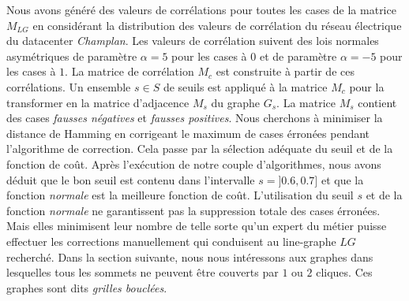 Nous avons g\'en\'er\'e des valeurs de corr\'elations pour toutes les cases de la matrice $M_{LG}$ en consid\'erant la distribution des valeurs de corr\'elation du r\'eseau \'electrique du datacenter {\em Champlan}. 
Les valeurs de corr\'elation suivent des lois normales asym\'etriques de param\`etre $\alpha = 5$ pour les cases \`a $0$ et  de param\`etre $\alpha = -5$ pour les cases \`a $1$.
La matrice de corr\'elation $M_c$ est construite \`a partir de ces corr\'elations.
Un ensemble $s \in S$ de seuils est appliqu\'e \`a la matrice $M_c$ pour la transformer en la matrice d'adjacence $M_s$ du graphe $G_s$. 
La matrice $M_s$ contient des cases {\em fausses n\'egatives} et {\em fausses positives}. 
Nous cherchons \`a minimiser la distance de Hamming en corrigeant le maximum de cases \'erron\'ees pendant l'algorithme de correction. Cela passe par la s\'election ad\'equate du seuil et de la fonction de co\^ut.
Apr\`es l'ex\'ecution de notre couple d'algorithmes, nous  avons d\'eduit que le bon seuil est contenu dans l'intervalle $s = ]0.6,0.7]$ et que la fonction {\em normale} est la meilleure fonction de co\^ut. 
L'utilisation du seuil $s$ et de la fonction {\em normale} ne garantissent pas la suppression totale des cases \'erron\'ees.  Mais elles minimisent leur nombre de telle sorte qu'un expert du m\'etier puisse effectuer les corrections manuellement qui conduisent au line-graphe $LG$ recherch\'e.
Dans la section suivante, nous nous int\'eressons aux graphes dans lesquelles tous les sommets ne peuvent \^etre couverts par $1$ ou $2$ cliques. Ces graphes sont dits {\em grilles boucl\'ees}. 